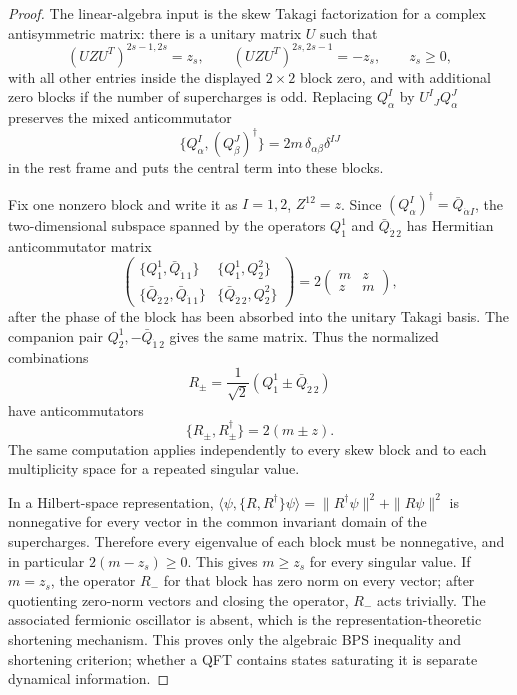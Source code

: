 \begin{proof}
The linear-algebra input is the skew Takagi factorization for a complex
antisymmetric matrix: there is a unitary matrix \(U\) such that
\[
  (U Z U^T)^{2s-1,2s}=z_s,\qquad
  (U Z U^T)^{2s,2s-1}=-z_s,\qquad z_s\ge0,
\]
with all other entries inside the displayed \(2\times2\) block zero, and with
additional zero blocks if the number of supercharges is odd.  Replacing
\(Q^I_\alpha\) by \(U^I{}_JQ^J_\alpha\) preserves the mixed anticommutator
\[
  \{Q^I_\alpha,(Q^J_\beta)^\dagger\}=2m\,\delta_{\alpha\beta}\delta^{IJ}
\]
in the rest frame and puts the central term into these blocks.

Fix one nonzero block and write it as \(I=1,2\), \(Z^{12}=z\).  Since
\((Q^I_\alpha)^\dagger=\bar Q_{\dot\alpha I}\), the two-dimensional subspace
spanned by the operators \(Q^1_1\) and \(\bar Q_{\dot2\,2}\) has Hermitian
anticommutator matrix
\[
  \begin{pmatrix}
  \{Q^1_1,\bar Q_{\dot1\,1}\}
  &
  \{Q^1_1,Q^2_2\}
  \\
  \{\bar Q_{\dot2\,2},\bar Q_{\dot1\,1}\}
  &
  \{\bar Q_{\dot2\,2},Q^2_2\}
  \end{pmatrix}
  =
  2
  \begin{pmatrix}
  m & z\\
  z & m
  \end{pmatrix},
\]
after the phase of the block has been absorbed into the unitary Takagi basis.
The companion pair \(Q^1_2,-\bar Q_{\dot1\,2}\) gives the same matrix.  Thus
the normalized combinations
\[
  R_\pm=\frac{1}{\sqrt2}\left(Q^1_1\pm \bar Q_{\dot2\,2}\right)
\]
have anticommutators
\[
  \{R_\pm,R_\pm^\dagger\}=2(m\pm z).
\]
The same computation applies independently to every skew block and to each
multiplicity space for a repeated singular value.

In a Hilbert-space representation, \(\langle\psi,\{R,R^\dagger\}\psi\rangle
=\|R^\dagger\psi\|^2+\|R\psi\|^2\) is nonnegative for every vector in the
common invariant domain of the supercharges.  Therefore every eigenvalue of
each block must be nonnegative, and in particular \(2(m-z_s)\ge0\).  This gives
\(m\ge z_s\) for every singular value.  If \(m=z_s\), the operator \(R_-\) for
that block has zero norm on every vector; after quotienting zero-norm vectors
and closing the operator, \(R_-\) acts trivially.  The associated fermionic
oscillator is absent, which is the representation-theoretic shortening
mechanism.  This proves only the algebraic BPS inequality and shortening
criterion; whether a QFT contains states saturating it is separate dynamical
information.
\end{proof}

